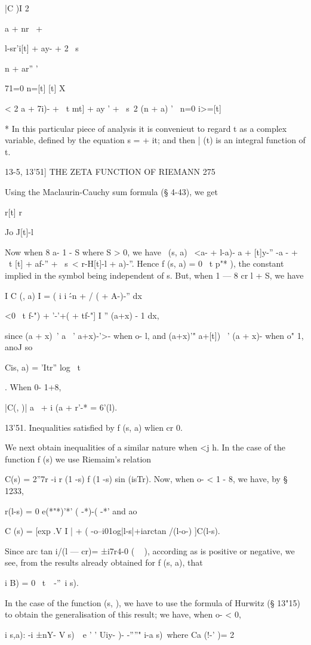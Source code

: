 |C )I 2 \ \ {a + nr \ + \ \ { l-sr'i[t] + ay- + 2 \ s\ \ {n + ar'' '

71=0 n=[t] [t] X

< 2 a + 7i)- + \ t mt] + ay ' + \ s\ 2 (n + a) ' \ n=0 i>=[t]

* In this particular piece of analysis it is convenieut to regard t as
a complex variable, defined by the equation s = + it; and then | (t)
is an integral function of t.

13-5, 13'51] THE ZETA FUNCTION OF RIEMANN 275

Using the Maclaurin-Cauchy sum formula (§ 4-43), we get

r[t] r

Jo J[t]-l

Now when 8 a- 1 - S where S > 0, we have \ (s, a) \ <a- + l-a)- a +
[t]y-'' -a - + \ t [t] + af-'' + \ s\ < r-H[t]-l + a)-''. Hence f (s,
a) = 0 \ t p"* ), the constant implied in the symbol being independent
of s. But, when 1 — 8 cr l + S, we have

I C (, a) I = ( i i \'-n + / ( + A-)-'' dx

<0 \ t f-") + '-'+( + tf-"] I '' (a+x) - 1 dx,

since (a + x)~' a ~' a+x)-'>- when o- l, and (a+x)'" a+[t]) ~' (a +
x)- when o" 1, anoJ so

Cis, a) = 'Itr'' log \ t\ \ }. When 0- 1+8,

|C(, )| a~ + i (a + r'-* = 6'(l).

13'51. Inequalities satisfied by f (s, a) wlien cr 0.

We next obtain inequalities of a similar nature when <j h. In the case
of the function f (s) we use Riemaim's relation

C(s) = 2''7r -i r (1 -s) f (1 -s) sin (isTr). Now, when o- < 1 - 8, we
have, by § 1233,

r(l-s) = 0 e(*"*)'*' ( -*)-( -*' and ao

C (s) = [exp .V I | + ( -o--i01og|l-s|+iarctan /(l-o-) ]C(l-s).

Since arc tan i/(l — cr)= ±i7r4-0 ( ~ ), according as is positive or
negative, we see, from the results already obtained for f (s, a), that

i B) = 0 \ t\ \ -''\ i s).

In the case of the function (s, ), we have to use the formula of
Hurwitz (§ 13"15) to obtain the generalisation of this result; we
have, when o- < 0,

i s,a): -i ±nY- V s)\ \ e ' ' Uiy- )- -''''" i-a s)\ where Ca (!-' )=
2

}}
